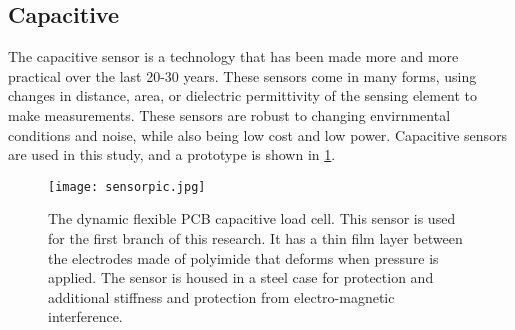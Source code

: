 \subsection{Capacitive}

The capacitive sensor is a technology that has been made more and more practical over the last 20-30 years.
These sensors come in many forms, using changes in distance, area, or dielectric permittivity of the sensing element
to make measurements. These sensors are robust to changing envirnmental conditions and noise, 
while also being low cost and low power.
Capacitive sensors are used in this study, and a prototype is shown in \ref{fig:flexcell}.

\begin{figure}[ht]
\centering
\texttt{[image: sensorpic.jpg]}
\caption{The dynamic flexible PCB capacitive load cell. 
This sensor is used for the first branch of this research.
It has a thin film layer between the electrodes made of polyimide 
that deforms when pressure is applied. The sensor is housed in a steel case for
protection and additional stiffness and protection from electro-magnetic interference.
}
\label{fig:flexcell}
\end{figure}
